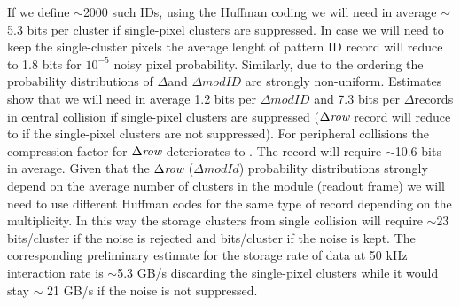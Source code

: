 If we define $\sim$2000 such IDs, using the Huffman coding we will need in average $\sim$5.3 bits per cluster if single-pixel
clusters are suppressed. In case we will need to keep the single-cluster pixels the average lenght of pattern ID record
will reduce to 1.8 bits for $10^{-5}$ noisy pixel probability.
Similarly, due to the ordering the probability distributions of $\Delta$\row and $\Delta modID$ are strongly non-uniform. 
Estimates show that we will need in average 1.2 bits per $\Delta modID$ and 7.3 bits per $\Delta$\row records in 
central \pbpb collision if single-pixel clusters are suppressed ($\Delta \textit{row}$ record will reduce to 
 if the single-pixel clusters are not suppressed). 
For peripheral collisions the compression factor for $\Delta \textit{row}$ deteriorates to . The \col record will require $\sim$10.6 bits in average. 
Given that the $\Delta \textit{row}$ ($\Delta modId$) probability distributions strongly depend on the average number
of clusters in the module (readout frame) we will need to use different Huffman codes for the same type of record depending
on the multiplicity. 
In this way the storage clusters from single \pbpb collision will require $\sim$23 bits/cluster if the noise is rejected
and  bits/cluster if the noise is kept. The corresponding preliminary estimate for the storage 
rate of \pbpb data at 50 kHz interaction rate is $\sim$5.3 GB/s discarding the single-pixel clusters while it would
stay $\sim$ 21 GB/s if the noise is not suppressed.
